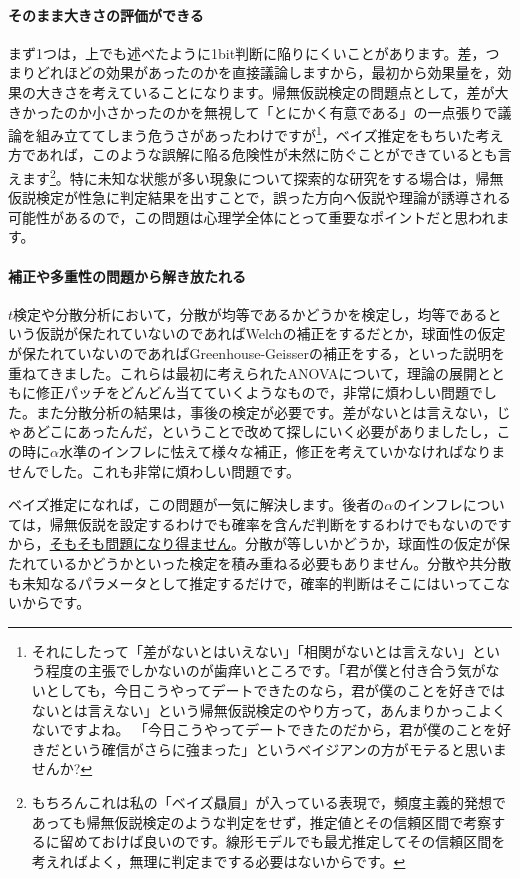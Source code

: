 \documentclass{ltjbook}
\begin{document}
\paragraph{そのまま大きさの評価ができる}
まず1つは，上でも述べたように1bit判断に陥りにくいことがあります。差，つまりどれほどの効果があったのかを直接議論しますから，最初から効果量を，効果の大きさを考えていることになります。帰無仮説検定の問題点として，差が大きかったのか小さかったのかを無視して「とにかく有意である」の一点張りで議論を組み立ててしまう危うさがあったわけですが\footnote{それにしたって「差がないとはいえない」「相関がないとは言えない」という程度の主張でしかないのが歯痒いところです。「君が僕と付き合う気がないとしても，今日こうやってデートできたのなら，君が僕のことを好きではないとは言えない」という帰無仮説検定のやり方って，あんまりかっこよくないですよね。 「今日こうやってデートできたのだから，君が僕のことを好きだという確信がさらに強まった」というベイジアンの方がモテると思いませんか? }，ベイズ推定をもちいた考え方であれば，このような誤解に陥る危険性が未然に防ぐことができているとも言えます\footnote{もちろんこれは私の「ベイズ贔屓」が入っている表現で，頻度主義的発想であっても帰無仮説検定のような判定をせず，推定値とその信頼区間で考察するに留めておけば良いのです。線形モデルでも最尤推定してその信頼区間を考えればよく，無理に判定までする必要はないからです。}。特に未知な状態が多い現象について探索的な研究をする場合は，帰無仮説検定が性急に判定結果を出すことで，誤った方向へ仮説や理論が誘導される可能性があるので，この問題は心理学全体にとって重要なポイントだと思われます。

\paragraph{補正や多重性の問題から解き放たれる}
$t$検定や分散分析において，分散が均等であるかどうかを検定し，均等であるという仮説が保たれていないのであればWelchの補正をするだとか，球面性の仮定が保たれていないのであればGreenhouse-Geisserの補正をする，といった説明を重ねてきました。これらは最初に考えられたANOVAについて，理論の展開とともに修正パッチをどんどん当てていくようなもので，非常に煩わしい問題でした。また分散分析の結果は，事後の検定が必要です。差がないとは言えない，じゃあどこにあったんだ，ということで改めて探しにいく必要がありましたし，この時に$\alpha$水準のインフレに怯えて様々な補正，修正を考えていかなければなりませんでした。これも非常に煩わしい問題です。

ベイズ推定になれば，この問題が一気に解決します。後者の$\alpha$のインフレについては，帰無仮説を設定するわけでも確率を含んだ判断をするわけでもないのですから，\underline{そもそも問題になり得ません}。分散が等しいかどうか，球面性の仮定が保たれているかどうかといった検定を積み重ねる必要もありません。分散や共分散も未知なるパラメータとして推定するだけで，確率的判断はそこにはいってこないからです。
\end{document}
